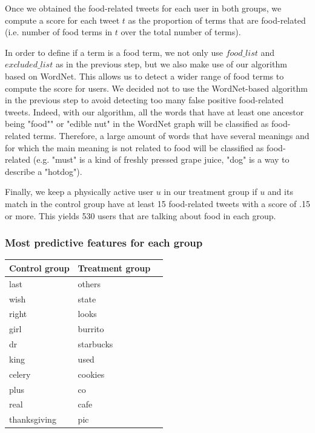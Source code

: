 \documentclass[letterpaper]{article}
\begin{document}
Once we obtained the food-related tweets for each user in both groups, we
compute a score for each tweet $t$ as the proportion of terms that are
food-related (i.e. number of food terms in $t$ over the total number of terms).

In order to define if a term is a food term, we not only use $food\_list$ and
$excluded\_list$ as in the previous step, but we also make use of our algorithm
based on WordNet. This allows us to detect a wider range of food terms to
compute the score for users. We decided not to use the WordNet-based algorithm
in the previous step to avoid detecting too many false positive food-related
tweets. Indeed, with our algorithm, all the words that have at least one
ancestor being "food"" or "edible nut" in the WordNet graph will be classified
as food-related terms. Therefore, a large amount of words that have several
meanings and for which the main meaning is not related to food will be
classified as food-related (e.g. "must" is a kind of freshly pressed grape
juice, "dog" is a way to describe a "hotdog").

Finally, we keep a physically active user $u$ in our treatment group if $u$ and
its match in the control group have at least 15 food-related tweets with a score
of .15 or more. This yields 530 users that are talking about food in each group.

\subsubsection{Most predictive features for each group}

\begin{table}
  \begin{tabular}{lll}
  \toprule
  \textbf{Control group} &     \textbf{Treatment group} \\
  \midrule
          last &     others \\
          wish &      state \\
         right &      looks \\
          girl &    burrito \\
            dr &  starbucks \\
          king &       used \\
        celery &    cookies \\
          plus &         co \\
          real &       cafe \\
  thanksgiving &        pic \\
  \bottomrule
  \end{tabular}
\end{table}
\end{document}
